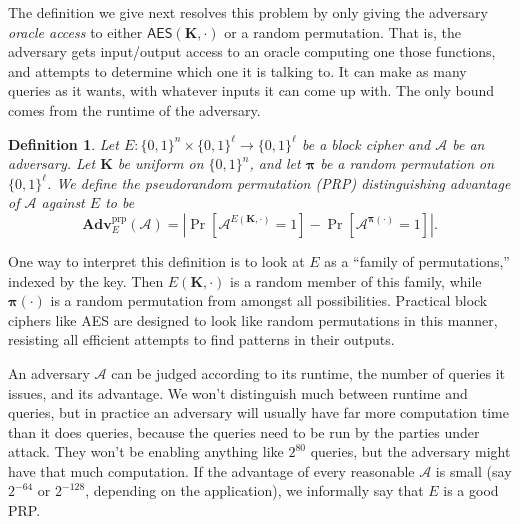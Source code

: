 \documentclass[11pt]{article}
\newtheorem{definition}{Definition}
\newcommand{\calA}{\mathcal{A}}
\newcommand{\AES}{\mathsf{AES}}
\newcommand{\Adv}{\mathbf{Adv}}
\newcommand{\AdvPRP}[2]{\Adv^{\mathrm{prp}}_{#1}({#2})}
\newcommand{\bits}{\{0,1\}}
\newcommand{\bK}{\mathbf{K}}
\newcommand{\bop}{\bm{\pi}}
\begin{document}
The definition we give next resolves this problem by only giving the adversary
\emph{oracle access} to either $\AES(\bK,\cdot)$ or a random permutation. That
is, the adversary gets input/output access to an oracle computing one those
functions, and attempts to determine which one it is talking to. It can make
as many queries as it wants, with whatever inputs it can come up with. The only
bound comes from the runtime of the adversary.
\begin{definition}
    Let $E:\bits^n\times\bits^\ell\to\bits^\ell$ be a block cipher
    and $\calA$ be an adversary.
    Let $\bK$ be uniform on $\bits^n$, and let $\bop$ be a random permutation
    on $\bits^\ell$.
    We define the \emph{pseudorandom permutation (PRP) distinguishing advantage
    of $\calA$ against $E$} to be
    \[
        \AdvPRP{E}{\calA} =
        \left|\Pr[\calA^{E(\bK,\cdot)}=1]-\Pr[\calA^{\bop(\cdot)}=1]\right|.
    \]
\end{definition}
One way to interpret this definition is to look at $E$ as a ``family of
permutations,''  indexed by the key. Then $E(\bK,\cdot)$ is a random member of
this family, while $\bop(\cdot)$ is a random permutation from amongst all
possibilities. Practical block ciphers like AES are designed to look like
random permutations in this manner, resisting all efficient attempts to
find patterns in their outputs.

An adversary $\calA$ can be judged according to its runtime, the number of
queries it issues, and its advantage. We won't distinguish much between runtime
and queries, but in practice an adversary will usually have far more
computation time than it does queries, because the queries need to be run by
the parties under attack. They won't be enabling anything like $2^{80}$ queries,
but the adversary might have that much computation.  If the advantage of every
reasonable $\calA$ is small (say $2^{-64}$ or $2^{-128}$,
depending on the application), we informally say that $E$ is a good PRP. 
\end{document}
